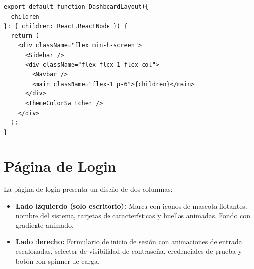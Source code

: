 \begin{lstlisting}[style=typescript, caption=DashboardLayout - Sidebar + Navbar]
export default function DashboardLayout({
  children
}: { children: React.ReactNode }) {
  return (
    <div className="flex min-h-screen">
      <Sidebar />
      <div className="flex flex-1 flex-col">
        <Navbar />
        <main className="flex-1 p-6">{children}</main>
      </div>
      <ThemeColorSwitcher />
    </div>
  );
}
\end{lstlisting}

\section{P\'agina de Login}

La p\'agina de login presenta un dise\~no de dos columnas:

\begin{itemize}[leftmargin=*]
    \item \textbf{Lado izquierdo (solo escritorio):} Marca con iconos de
          mascota flotantes, nombre del sistema, tarjetas de caracter\'isticas
          y huellas animadas. Fondo con gradiente animado.
    \item \textbf{Lado derecho:} Formulario de inicio de sesi\'on con
          animaciones de entrada escalonadas, selector de visibilidad de
          contrase\~na, credenciales de prueba y bot\'on con spinner de carga.
\end{itemize}
